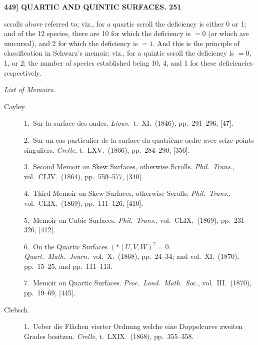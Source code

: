 \documentclass[11pt]{article}
\begin{document}
\medskip
\noindent\textbf{449] \quad QUARTIC AND QUINTIC SURFACES. \hfill 251}

\medskip

scrolls above referred to; viz., for a quartic scroll the deficiency is either 0 or 1;
and of the 12 species, there are 10 for which the deficiency is $=0$ (or which are
unicursal), and 2 for which the deficiency is $=1$. And this is the principle of classi\-fication
in Schwarz's memoir; viz., for a quintic scroll the deficiency is $=0$, 1, or 2;
the number of species established being 10, 4, and 1 for these deficiencies respectively.

\medskip
\begin{center}\textit{List of Memoirs.}\end{center}

\begin{description}
\item[Cayley.] 1.\ Sur la surface des ondes. \textit{Liouv.}\ t.\ XI.\ (1846), pp.~291--296, [47].

\item[] 2.\ Sur un cas particulier de la surface du quatri\`eme ordre avec seize points singuliers. \textit{Crelle}, t.\ LXV.\ (1866), pp.~284--290, [356].

\item[] 3.\ Second Memoir on Skew Surfaces, otherwise Scrolls. \textit{Phil.\ Trans.}, vol.\ CLIV.\ (1864), pp.~559--577, [340].

\item[] 4.\ Third Memoir on Skew Surfaces, otherwise Scrolls. \textit{Phil.\ Trans.}, vol.\ CLIX.\ (1869), pp.~111--126, [410].

\item[] 5.\ Memoir on Cubic Surfaces. \textit{Phil.\ Trans.}, vol.\ CLIX.\ (1869), pp.~231--326, [412].

\item[] 6.\ On the Quartic Surfaces $(*\mid U, V, W)^2 = 0$. \textit{Quart.\ Math.\ Journ.}\ vol.\ X.\ (1868), pp.~24--34; and vol.\ XI.\ (1870), pp.~15--25, and pp.~111--113.

\item[] 7.\ Memoir on Quartic Surfaces. \textit{Proc.\ Lond.\ Math.\ Soc.}, vol.\ III.\ (1870), pp.~19--69, [445].

\item[Clebsch.] 1.\ Ueber die Fl\"achen vierter Ordnung welche eine Doppelcurve zweiten Grades besitzen. \textit{Crelle}, t.\ LXIX.\ (1868), pp.~355--358.


\end{description}
\end{document}
